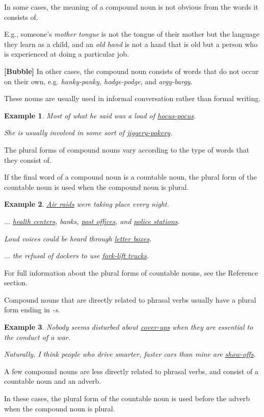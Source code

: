\documentclass[oneside]{book}
\numberwithin{equation}{section}
\newtheorem{example}{Example}[section]
\begin{document}
%
\noindent{} In some cases, the meaning of a compound noun is not obvious from the words it consists of.

%
E.g., someone's \textit{mother tongue} is not the tongue of their mother but the language they learn as a child, and an \textit{old hand} is not a hand that is old but a person who is experienced at doing a particular job.

%
\textbf{[Bubble]} In other cases, the compound noun consists of words that do not occur on their own, e.g. \textit{hanky-panky, hodge-podge}, and \textit{argy-bargy}.

These nouns are usually used in informal conversation rather than formal writing.
\begin{example}
    Most of what he said was a load of \underline{hocus-pocus}.
    
    She is usually involved in some sort of \underline{jiggery-pokery}.
\end{example}
%
\noindent{} The plural forms of compound nouns vary according to the type of words that they consist of.

If the final word of a compound noun is a countable noun, the plural form of the countable noun is used when the compound noun is plural.
\begin{example}
    \underline{Air raids} were taking place every night.
    
    $\ldots$ \underline{health centers}, banks, \underline{post offices}, and \underline{police stations}.
    
    Loud voices could be heard through \underline{letter boxes}.
    
    $\ldots$ the refusal of dockers to use \underline{fork-lift trucks}.
\end{example}
For full information about the plural forms of countable nouns, see the Reference section.

%
Compound nouns that are directly related to phrasal verbs usually have a plural form ending in \textit{-s}.
\begin{example}
    Nobody seems disturbed about \underline{cover-ups} when they are essential to the conduct of a war.
    
    Naturally, I think people who drive smarter, faster cars than mine are \underline{show-offs}.
\end{example}
A few compound nouns are less directly related to phrasal verbs, and consist of a countable noun and an adverb.

In these cases, the plural form of the countable noun is used before the adverb when the compound noun is plural.
\end{document}
